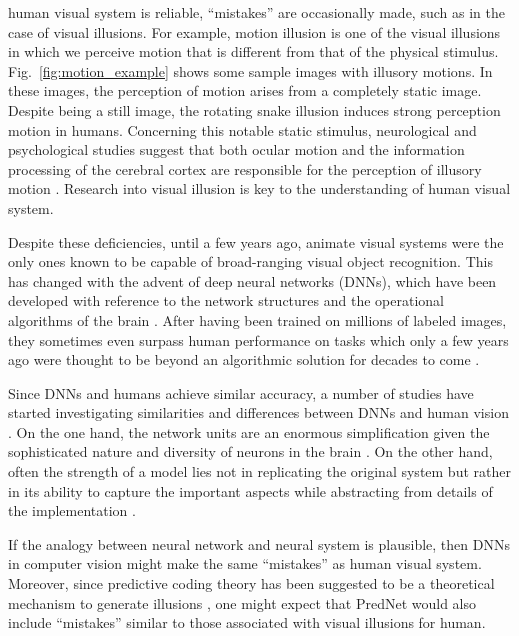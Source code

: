 \documentclass[journal]{IEEEtran}
\begin{document}
 human visual system is reliable, ``mistakes'' are occasionally made, such as in the case of visual illusions. For example, motion illusion is one of the visual illusions in which we perceive motion that is different from that of the physical stimulus. Fig.~\ref{fig:motion_example} shows some sample images with illusory motions. In these images, the perception of motion arises from a completely static image. Despite being a still image, the rotating snake illusion induces strong perception motion in humans. Concerning this notable static stimulus, neurological and psychological studies suggest that both ocular motion and the information processing of the cerebral cortex are responsible for the perception of illusory motion \cite{HISAKATA20081940}. Research into visual illusion is key to the understanding of human visual system.

Despite these deficiencies, until a few years ago, animate visual systems were the only ones known to be capable of broad-ranging visual object recognition. This has changed with the advent of deep neural networks (DNNs), which have been developed with reference to the network structures and the operational algorithms of the brain \cite{geirhos2018generalisation}. After having been trained on millions of labeled images, they sometimes even surpass human performance on tasks which only a few years ago were thought to be beyond an algorithmic solution for decades to come \cite{he2015delving, silver2016mastering}.

Since DNNs and humans achieve similar accuracy, a number of studies have started investigating similarities and differences between DNNs and human vision \cite{cadieu2014deep, yamins2014performance, cichy2017dynamics}. On the one hand, the network units are an enormous simplification given the sophisticated nature and diversity of neurons in the brain .  On the other hand, often the strength of a model lies not in replicating the original system but rather in its ability to capture the important aspects while abstracting from details of the implementation \cite{kriegeskorte2015deep}.

If the analogy between neural network and neural system is plausible, then DNNs in computer vision might make the same ``mistakes'' as human visual system. Moreover, since predictive coding theory has been suggested to be a theoretical mechanism to generate illusions \cite{notredame2014visual}, one might expect that PredNet would also include ``mistakes'' similar to those associated with visual illusions for human.
\end{document}
